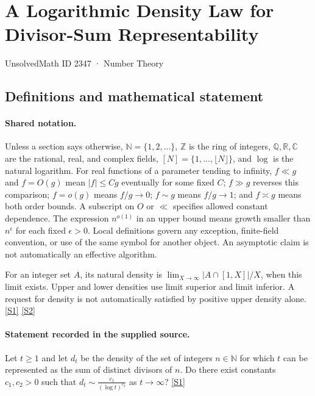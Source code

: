 \documentclass[11pt,a4paper]{article}
\newcommand{\N}{\mathbb{N}}
\newcommand{\Z}{\mathbb{Z}}
\newcommand{\Q}{\mathbb{Q}}
\newcommand{\R}{\mathbb{R}}
\newcommand{\C}{\mathbb{C}}
\newcommand{\sref}[2]{\hyperlink{source:#1:#2}{[S#2]}}
\begin{document}

\setcounter{section}{2346}

\section{A Logarithmic Density Law for Divisor-Sum Representability}\label{2347}

{\small\sffamily UnsolvedMath ID 2347 · Number Theory}

\subsection{Definitions and mathematical statement}

\paragraph{Shared notation.}Unless a section says otherwise, $\N=\{1,2,\ldots\}$,
$\Z$ is the ring of integers, $\Q,\R,\C$ are the rational, real, and complex
fields, $[N]=\{1,\ldots,\lfloor N\rfloor\}$, and $\log$ is the natural
logarithm. For real functions of a parameter tending to infinity,
$f\ll g$ and $f=O(g)$ mean $|f|\leq Cg$ eventually for some fixed $C$;
$f\gg g$ reverses this comparison; $f=o(g)$ means $f/g\to0$;
$f\sim g$ means $f/g\to1$; and $f\asymp g$ means both order bounds.
A subscript on $O$ or $\ll$ specifies allowed constant dependence.
The expression $n^{o(1)}$ in an upper bound means growth smaller than
$n^\epsilon$ for each fixed $\epsilon>0$. Local definitions govern any
exception, finite-field convention, or use of the same symbol for another
object. An asymptotic claim is not automatically an effective algorithm.



For an integer set $A$, its natural density is $\lim_{X\to\infty}|A\cap[1,X]|/X$, when this limit exists. Upper and lower densities use limit superior and limit inferior. A request for density is not automatically satisfied by positive upper density alone. \sref{2347}{1} \sref{2347}{2}

\paragraph{Statement recorded in the supplied source.}
Let $t\geq 1$ and let $d_t$ be the density of the set of integers $n\in\mathbb{N}$ for which $t$ can be represented as the sum of distinct divisors of $n$.
Do there exist constants $c_1,c_2>0$ such that $ d_t \sim \frac{c_1}{(\log t)^{c_2}} $ as $t\to \infty$? \sref{2347}{1}
\end{document}
